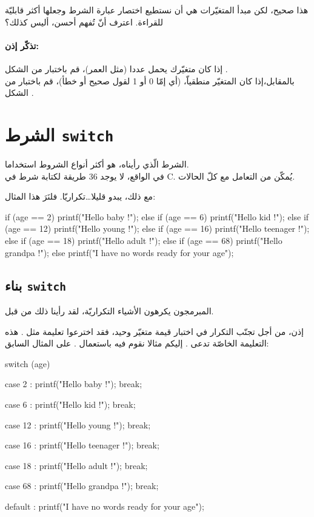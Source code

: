 هذا صحيح، لكن مبدأ المتغيّرات هي أن نستطيع اختصار عبارة الشرط وجعلها أكثر قابليّة للقراءة. اعترف أنّ
تُفهم أحسن، أليس كذلك؟

\paragraph{تذكّر إذن:}
إذا كان متغيّرك يحمل عددا (مثل العمر)، قم باختبار من الشكل
.\\
بالمقابل،إذا كان المتغيّر منطقياّ، (أي إمّا 0 أو 1 لقول صحيح أو خطأ)، قم باختبار من الشكل
.

\section{الشرط \texttt{switch}}

الشرط
الّذي رأيناه، هو أكثر أنواع الشروط استخداما.\\
في الواقع، لا يوجد 36 طريقة لكتابة شرط في \textenglish{C}.
يُمكّن من التعامل مع كلّ الحالات.

مع ذلك،
يبدو قليلا\dots تكراريّا. فلنَرَ هذا المثال:

\begin{Csource}
if (age == 2)
{
	printf("Hello baby !");
}
else if (age == 6)
{
	printf("Hello kid !");
}
else if (age == 12)
{
	printf("Hello young !");
}
else if (age == 16)
{
	printf("Hello teenager !");
}
else if (age == 18)
{
	printf("Hello adult !");
}
else if (age == 68)
{
	printf("Hello grandpa !");
}
else
{
	printf("I have no words ready for your age");
}
\end{Csource}

\subsection{بناء \texttt{switch}}

المبرمجون يكرهون الأشياء التكراريّة، لقد رأينا ذلك من قبل.

إذن، من أجل تجنّب التكرار في اختبار قيمة متغيّر وحيد، فقد اخترعوا تعليمة مثل
.
هذه التعليمة الخاصّة تدعى
.
إليكم مثالا نقوم فيه باستعمال
.
على المثال السابق:

\begin{Csource}
switch (age)
{
	case 2 :
	printf("Hello baby !");
	break;
	
	case 6 :
	printf("Hello kid !");
	break;
	
	case 12 :
	printf("Hello young !");
	break;
	
	case 16 :
	printf("Hello teenager !");
	break;
	
	case 18 :
	printf("Hello adult !");
	break;
	
	case 68 :
	printf("Hello grandpa !");
	break;
	
	default :
	printf("I have no words ready for your age");
}
\end{Csource}


